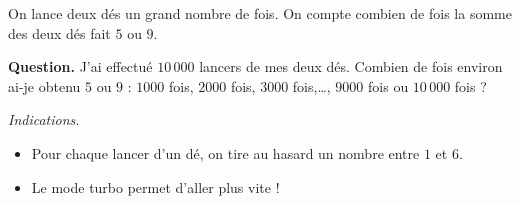 \documentclass[class=report,crop=false, 12pt]{standalone}
\begin{document}


\begin{enigme}

On lance deux dés un grand nombre de fois.
On compte combien de fois la somme des deux dés fait $5$ ou $9$.




\bigskip

\textbf{Question.} J'ai effectué $10\,000$ lancers de mes deux dés. Combien de fois environ ai-je obtenu $5$ ou $9$ :
$1000$ fois, $2000$ fois, $3000$ fois,\ldots, $9000$ fois ou $10\, 000$ fois ?

\bigskip
\emph{Indications.}
\begin{itemize}
  \item Pour chaque lancer d'un dé, on tire au hasard un nombre entre $1$ et $6$.
  \item Le mode turbo permet d'aller plus vite !
\end{itemize}



%

\end{enigme}
\end{document}
